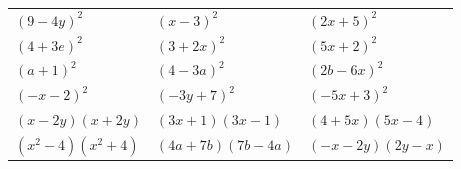 \documentclass[12pt,a4paper]{article}
\theoremstyle{break}
\begin{document}
	\begin{enumerate}[a)] \begin{tabular}{p{5cm} p{5cm} p{5cm}} 
		\item $(9-4y)^2$ & \vspace{0.25cm}\item$(x-3)^2$ &\vspace{0.25cm}\item $(2x+5)^2$\\
		\item $(4+3e)^2$ & \item $(3+2x)^2$ &\item $(5x+2)^2$\\
		\item $(a+1)^2$ & \item $(4-3a)^2$ &\item $(2b-6x)^2$\\
		\item $(-x-2)^2$ & \item $(-3y+7)^2$ &\item $(-5x+3)^2$\\
		\item $(x-2y)(x+2y)$ & \item $(3x+1)(3x-1)$ &\item $(4+5x)(5x-4)$\\
		\item $(x^2-4)(x^2+4)$ & \item $(4a+7b)(7b-4a)$ &\item $(-x-2y)(2y-x)$\\
\end{tabular} \end{enumerate}
	
	
	
\end{document}
